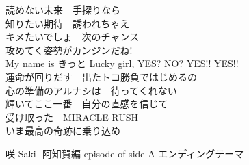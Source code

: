 {読めない未来　手探りなら\\
知りたい期待　誘われちゃえ\\
キメたいでしょ　次のチャンス\\
攻めてく姿勢がカンジンだね!\\
My name is きっと Lucky girl, YES? NO? YES!! YES!!\\

運命が回りだす　出たトコ勝負ではじめるの\\
心の準備のアルナシは　待ってくれない\\
輝いてここ一番　自分の直感を信じて\\
受け取った　MIRACLE RUSH\\
いま最高の奇跡に乗り込め
}


{咲-Saki- 阿知賀編 episode of side-A エンディングテーマ}
